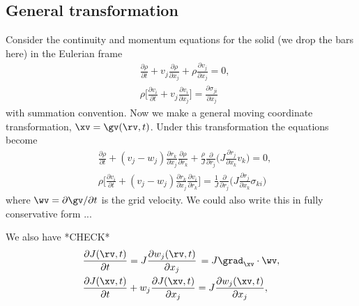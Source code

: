 \documentclass[11pt]{article}
\begin{document}
\subsection{General transformation}

Consider the continuity and momentum equations for the solid (we drop the bars here) in the Eulerian frame
\begin{align*}
  & \frac{\partial\rho}{\partial t} + v_j\frac{\partial\rho}{\partial x_j} + \rho \frac{\partial v_j}{\partial x_j} = 0 , \\
  & \rho \Big[\frac{\partial v_i }{\partial t} + v_j\frac{\partial v_i}{\partial x_j}\Big] = 
      \frac{\partial \sigma_{ji}}{\partial x_j} 
\end{align*}
with summation convention. Now we make a general moving coordinate transformation, $\xv=\gv(\rv,t)$. 
Under this transformation the equations become
\begin{align*}
  & \frac{\partial\rho}{\partial t} + (v_j-w_j)\frac{\partial r_k}{\partial x_j}\frac{\partial\rho}{\partial r_k} 
     + \frac{\rho}{J} \frac{\partial}{\partial r_j}\Big( J \frac{\partial r_j}{\partial x_k} v_k\Big) = 0 , \\
  & \rho \Big[\frac{\partial v_i }{\partial t} 
     + (v_j-w_j)\frac{\partial r_k}{\partial x_j}\frac{\partial v_i}{\partial r_k}\Big] =
   \frac{1}{J}\frac{\partial}{\partial r_j}\Big( J \frac{\partial r_j}{\partial x_k} \sigma_{ki} \Big) 
\end{align*}
where $\wv=\partial \gv/\partial t$ is the grid velocity. We could also write this in fully
conservative form ...



We also have *CHECK*
\begin{align*}
   & \frac{\partial J(\rv,t)}{\partial t} = J \frac{\partial w_j(\rv,t)}{\partial x_j} \, = J \grad_{\xv}\cdot \wv, \\
   & \frac{\partial J(\xv,t)}{\partial t} + w_j\frac{\partial J(\xv,t)}{\partial x_j}  = J \frac{\partial w_j(\xv,t)}{\partial x_j} , \\
\end{align*}
\end{document}
